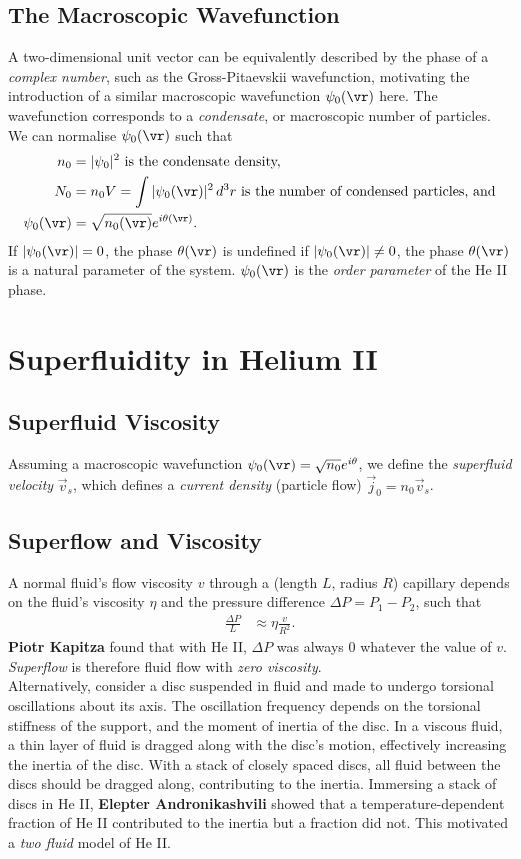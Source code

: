 \documentclass[a4paper, 11pt, normalem]{report}
\begin{document}
\section{The Macroscopic Wavefunction}
A two-dimensional unit vector can be equivalently described by the phase of a \emph{complex number}, such as the Gross-Pitaevskii wavefunction, motivating the introduction of a similar macroscopic wavefunction $\psi_0(\vr)$ here.
The wavefunction corresponds to a \emph{condensate}, or macroscopic number of particles.
We can normalise $\psi_0(\vr)$ such that
\begin{align}
    n_0 &= |\psi_0|^2 \text{ is the condensate density,} \\
    N_0 &= n_0V = \int |\psi_0(\vr)|^2\,d^3r \text{ is the number of condensed particles, and} \\
    \psi_0(\vr) &= \sqrt{n_0(\vr)}e^{i\theta(\vr)}.
\end{align}
If $|\psi_0(\vr)|=0$, the phase $\theta(\vr)$ is undefined if $|\psi_0(\vr)|\neq0$, the phase $\theta(\vr)$ is a natural parameter of the system.
$\psi_0(\vr)$ is the \emph{order parameter} of the He II phase.

\chapter{Superfluidity in Helium II}
\section{Superfluid Viscosity}
Assuming a macroscopic wavefunction $\psi_0(\vr)=\sqrt{n_0}e^{i\theta}$, we define the \emph{superfluid velocity} $\vec{v}_s$, which defines a \emph{current density} (particle flow) $\vec{j}_0=n_0\vec{v}_s$.

\section{Superflow and Viscosity}
A normal fluid's flow viscosity $v$ through a (length $L$, radius $R$) capillary depends on the fluid's viscosity $\eta$ and the pressure difference $\Delta P = P_1-P_2$, such that
\begin{align}
    \frac{\Delta P}{L} &\approx \eta\frac{v}{R^2}.
\end{align}
\textbf{Piotr Kapitza} found that with He II, $\Delta P$ was always 0 whatever the value of $v$.
\emph{Superflow} is therefore fluid flow with \emph{zero viscosity}.\\
Alternatively, consider a disc suspended in fluid and made to undergo torsional oscillations about its axis.
The oscillation frequency depends on the torsional stiffness of the support, and the moment of inertia of the disc.
In a viscous fluid, a thin layer of fluid is dragged along with the disc's motion, effectively increasing the inertia of the disc.
With a stack of closely spaced discs, all fluid between the discs should be dragged along, contributing to the inertia.
Immersing a stack of discs in He II, \textbf{Elepter Andronikashvili} showed that a temperature-dependent fraction of He II contributed to the inertia but a fraction did not.
This motivated a \emph{two fluid} model of He II.
\end{document}
